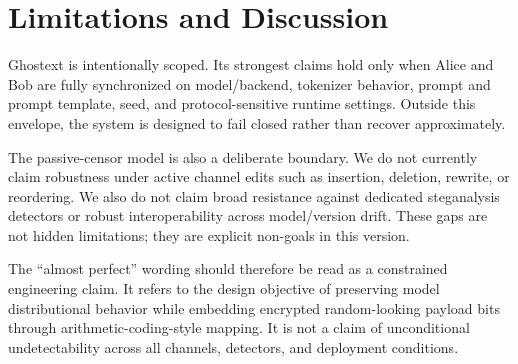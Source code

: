 \section{Limitations and Discussion}
Ghostext is intentionally scoped. Its strongest claims hold only when Alice and Bob are fully synchronized on model/backend, tokenizer behavior, prompt and prompt template, seed, and protocol-sensitive runtime settings. Outside this envelope, the system is designed to fail closed rather than recover approximately.

The passive-censor model is also a deliberate boundary. We do not currently claim robustness under active channel edits such as insertion, deletion, rewrite, or reordering. We also do not claim broad resistance against dedicated steganalysis detectors or robust interoperability across model/version drift. These gaps are not hidden limitations; they are explicit non-goals in this version.

The ``almost perfect'' wording should therefore be read as a constrained engineering claim. It refers to the design objective of preserving model distributional behavior while embedding encrypted random-looking payload bits through arithmetic-coding-style mapping. It is not a claim of unconditional undetectability across all channels, detectors, and deployment conditions.
